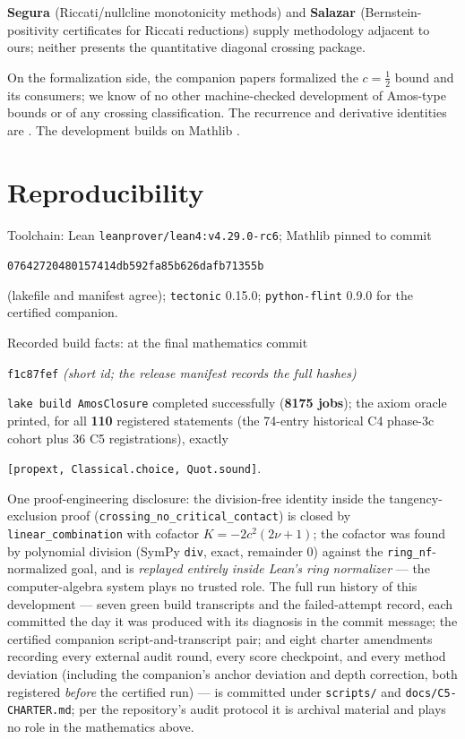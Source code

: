 \documentclass[11pt]{article}
\newcommand{\lean}[1]{\texttt{#1}}
\begin{document}
\textbf{Segura \cite{Segura21}} (Riccati/nullcline monotonicity
methods) and \textbf{Salazar \cite{Salazar26}} (Bernstein-positivity
certificates for Riccati reductions) supply methodology adjacent to
ours; neither presents the quantitative diagonal crossing package.

On the formalization side, the companion papers
\cite{ErikssonC2,ErikssonC3,ErikssonC4} formalized the
$c = \tfrac12$ bound and its consumers; we know of no other
machine-checked development of Amos-type bounds or of any crossing
classification.  The recurrence and derivative identities are
\cite[10.29]{DLMF}.  The development builds on Mathlib
\cite{mathlib20}.

\section{Reproducibility}\label{sec:repro}

Toolchain: Lean \lean{leanprover/lean4:v4.29.0-rc6}; Mathlib pinned
to commit
\begin{center}\small
\lean{07642720480157414db592fa85b626dafb71355b}
\end{center}
\noindent (lakefile and manifest agree); \lean{tectonic} 0.15.0;
\lean{python-flint} 0.9.0 for the certified companion.

\medskip
\noindent Recorded build facts: at the final mathematics commit
\begin{center}\small
\lean{f1c87fef} \emph{(short id; the release manifest records the
full hashes)}
\end{center}
\noindent \lean{lake build AmosClosure} completed successfully
(\textbf{8175 jobs}); the axiom oracle printed, for all
\textbf{110} registered statements (the 74-entry historical C4
phase-3c cohort plus 36 C5 registrations), exactly
\begin{center}
\lean{[propext, Classical.choice, Quot.sound]}.
\end{center}
\noindent One proof-engineering disclosure: the division-free
identity inside the tangency-exclusion proof
(\lean{crossing\_no\_critical\_contact}) is closed by
\lean{linear\_combination} with cofactor $K = -2c^2(2\nu+1)$; the
cofactor was found by polynomial division (SymPy \lean{div}, exact,
remainder $0$) against the \lean{ring\_nf}-normalized goal, and is
\emph{replayed entirely inside Lean's ring normalizer} --- the
computer-algebra system plays no trusted role.  The full run
history of this development --- seven green build transcripts and
the failed-attempt record, each committed the day it was produced
with its diagnosis in the commit message; the certified companion
script-and-transcript pair; and eight charter amendments recording
every external audit round, every score checkpoint, and every
method deviation (including the companion's anchor deviation and
depth correction, both registered \emph{before} the certified run)
--- is committed under \lean{scripts/} and
\lean{docs/C5-CHARTER.md}; per the repository's audit protocol it
is archival material and plays no role in the mathematics above.
\end{document}
